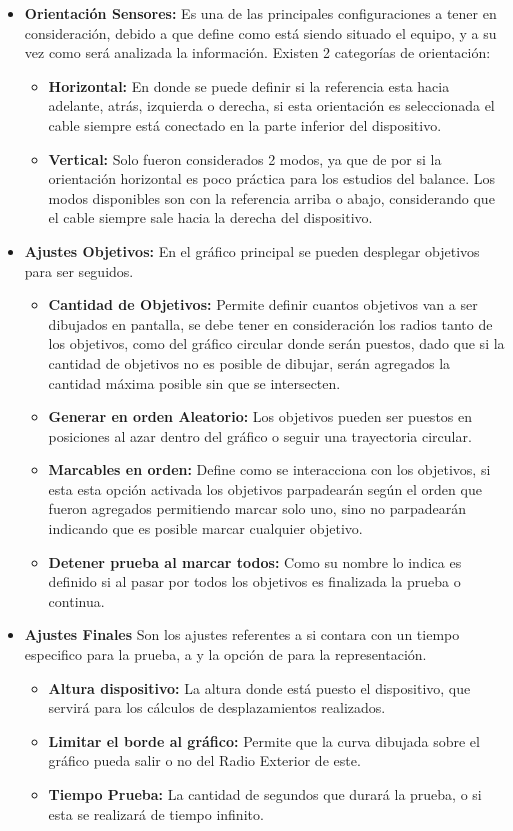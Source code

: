 \documentclass[12pt,a4paper]{article}
\begin{document}
\begin{itemize}
	\item \textbf{Orientación Sensores:} Es una de las principales configuraciones a tener en consideración, debido a que define como está siendo situado el equipo, y a su vez como será analizada la información.
	Existen 2 categorías de orientación:
	\begin{itemize}
		\item \textbf{Horizontal:} En donde se puede definir si la referencia esta hacia adelante, atrás, izquierda o derecha, si esta orientación es seleccionada el cable siempre está conectado en la parte inferior del dispositivo.
		\item \textbf{Vertical:} Solo fueron considerados 2 modos, ya que de por si la orientación horizontal es poco práctica para los estudios del balance.
		Los modos disponibles son con la referencia arriba o abajo, considerando que el cable siempre sale hacia la derecha del dispositivo.
	\end{itemize}
	\item \textbf{Ajustes Objetivos:} En el gráfico principal se pueden desplegar objetivos para ser seguidos.
	\begin{itemize}
		\item \textbf{Cantidad de Objetivos:} Permite definir cuantos objetivos van a ser dibujados en pantalla, se debe tener en consideración los radios tanto de los objetivos, como del gráfico circular donde serán puestos, dado que si la cantidad de objetivos no es posible de dibujar, serán agregados la cantidad máxima posible sin que se intersecten.
		\item \textbf{Generar en orden Aleatorio:} Los objetivos pueden ser puestos en posiciones al azar dentro del gráfico o seguir una trayectoria circular.
		\item \textbf{Marcables en orden:} Define como se interacciona con los objetivos, si esta esta opción activada los objetivos parpadearán según el orden que fueron agregados permitiendo marcar solo uno, sino no parpadearán indicando que es posible marcar cualquier objetivo.
		\item \textbf{Detener prueba al marcar todos:} Como su nombre lo indica es definido si al pasar por todos los objetivos es finalizada la prueba o continua.
	\end{itemize}
	
	\item \textbf{Ajustes Finales} Son los ajustes referentes a si contara con un tiempo especifico para la prueba, a  y la opción de  para la representación.
	\begin{itemize}
		\item \textbf{Altura dispositivo:} La altura donde está puesto el dispositivo, que servirá para los cálculos de desplazamientos realizados.
		\item \textbf{Limitar el borde al gráfico:} Permite que la curva dibujada sobre el gráfico pueda salir o no del Radio Exterior de este.
		\item \textbf{Tiempo Prueba:} La cantidad de segundos que durará la prueba, o si esta se realizará de tiempo infinito.
	\end{itemize}
\end{itemize}
\end{document}
